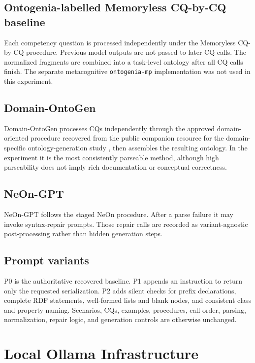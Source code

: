 \documentclass[11pt,a4paper]{article}
\newcommand{\code}[1]{\texttt{#1}}
\begin{document}
\subsection{Ontogenia-labelled Memoryless CQ-by-CQ baseline}

Each competency question is processed independently under the Memoryless
CQ-by-CQ procedure. Previous model outputs are not passed to later CQ calls.
The normalized fragments are combined into a task-level ontology after all CQ
calls finish. The separate metacognitive \code{ontogenia-mp} implementation was
not used in this experiment.

\subsection{Domain-OntoGen}

Domain-OntoGen processes CQs independently through the approved domain-oriented
procedure recovered from the public companion resource for the domain-specific
ontology-generation study \cite{lippolis2025domainspecific}, then assembles the
resulting ontology. In the experiment it is the most consistently parseable
method, although high parseability does not imply rich documentation or
conceptual correctness.

\subsection{NeOn-GPT}

NeOn-GPT follows the staged NeOn procedure. After a parse failure it may
invoke syntax-repair prompts. Those repair calls are recorded as
variant-agnostic post-processing rather than hidden generation steps.

\subsection{Prompt variants}

P0 is the authoritative recovered baseline. P1 appends an instruction to return
only the requested serialization. P2 adds silent checks for prefix declarations,
complete RDF statements, well-formed lists and blank nodes, and consistent class
and property naming. Scenarios, CQs, examples, procedures, call order, parsing,
normalization, repair logic, and generation controls are otherwise unchanged.

\section{Local Ollama Infrastructure}
\end{document}
